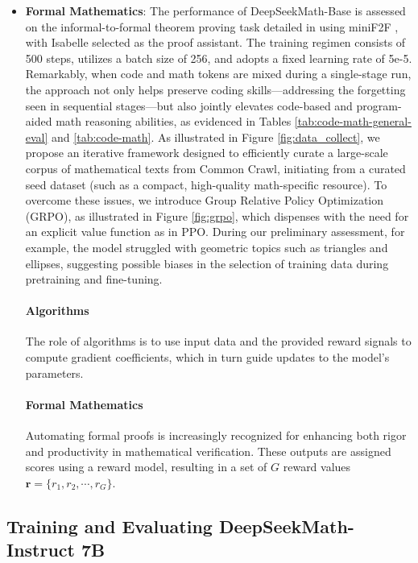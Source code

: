 \begin{algorithm}[t]
\begin{algorithmic}[1]
\begin{itemize}[topsep=0pt]
\item \textbf{Formal Mathematics}: The performance of DeepSeekMath-Base is assessed on the informal-to-formal theorem proving task detailed in \citep{dsp_proof} using miniF2F \citep{minif2f}, with Isabelle \citep{isabelle} selected as the proof assistant. The training regimen consists of 500 steps, utilizes a batch size of 256, and adopts a fixed learning rate of 5e-5. Remarkably, when code and math tokens are mixed during a single-stage run, the approach not only helps preserve coding skills—addressing the forgetting seen in sequential stages—but also jointly elevates code-based and program-aided math reasoning abilities, as evidenced in Tables \ref{tab:code-math-general-eval} and \ref{tab:code-math}. As illustrated in Figure \ref{fig:data_collect}, we propose an iterative framework designed to efficiently curate a large-scale corpus of mathematical texts from Common Crawl, initiating from a curated seed dataset (such as a compact, high-quality math-specific resource). To overcome these issues, we introduce Group Relative Policy Optimization (GRPO), as illustrated in Figure \ref{fig:grpo}, which dispenses with the need for an explicit value function as in PPO. During our preliminary assessment, for example, the model struggled with geometric topics such as triangles and ellipses, suggesting possible biases in the selection of training data during pretraining and fine-tuning. \paragraph{Algorithms} The role of algorithms is to use input data and the provided reward signals to compute gradient coefficients, which in turn guide updates to the model’s parameters. \paragraph{Formal Mathematics}

Automating formal proofs is increasingly recognized for enhancing both rigor and productivity in mathematical verification. These outputs are assigned scores using a reward model, resulting in a set of $G$ reward values $\mathbf{r} = \{r_1, r_2, \cdots, r_G\}$. \end{itemize}

\subsection{Training and Evaluating DeepSeekMath-Instruct 7B}


\end{algorithmic}
\end{algorithm}
